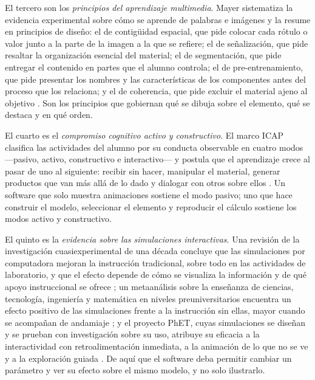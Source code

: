 El tercero son los \emph{principios del aprendizaje multimedia}. Mayer sistematiza la evidencia experimental sobre cómo se aprende de palabras e imágenes y la resume en principios de diseño: el de contigüidad espacial, que pide colocar cada rótulo o valor junto a la parte de la imagen a la que se refiere; el de señalización, que pide resaltar la organización esencial del material; el de segmentación, que pide entregar el contenido en partes que el alumno controla; el de pre-entrenamiento, que pide presentar los nombres y las características de los componentes antes del proceso que los relaciona; y el de coherencia, que pide excluir el material ajeno al objetivo \autocite{mayer2009multimedia}. %
Son los principios que gobiernan qué se dibuja sobre el elemento, qué se destaca y en qué orden.

El cuarto es el \emph{compromiso cognitivo activo y constructivo}. El marco ICAP clasifica las actividades del alumno por su conducta observable en cuatro modos —pasivo, activo, constructivo e interactivo— y postula que el aprendizaje crece al pasar de uno al siguiente: recibir sin hacer, manipular el material, generar productos que van más allá de lo dado y dialogar con otros sobre ellos \autocite{chi2014icap}. %
Un software que solo muestra animaciones sostiene el modo pasivo; uno que hace construir el modelo, seleccionar el elemento y reproducir el cálculo sostiene los modos activo y constructivo.

El quinto es la \emph{evidencia sobre las simulaciones interactivas}. Una revisión de la investigación cuasiexperimental de una década concluye que las simulaciones por computadora mejoran la instrucción tradicional, sobre todo en las actividades de laboratorio, y que el efecto depende de cómo se visualiza la información y de qué apoyo instruccional se ofrece \autocite{rutten2012learning}; %
un metaanálisis sobre la enseñanza de ciencias, tecnología, ingeniería y matemática en niveles preuniversitarios encuentra un efecto positivo de las simulaciones frente a la instrucción sin ellas, mayor cuando se acompañan de andamiaje \autocite{dangelo2014simulations}; %
y el proyecto PhET, cuyas simulaciones se diseñan y se prueban con investigación sobre su uso, atribuye su eficacia a la interactividad con retroalimentación inmediata, a la animación de lo que no se ve y a la exploración guiada \autocite{wieman2008phet}. %
De aquí que el software deba permitir cambiar un parámetro y ver su efecto sobre el mismo modelo, y no solo ilustrarlo.

